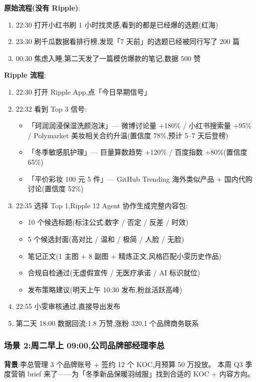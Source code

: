 \textbf{原始流程(没有 Ripple)}:
\begin{enumerate}
\item 22:30 打开小红书刷 1 小时找灵感,看到的都是已经爆的选题(红海)
\item 23:30 刷千瓜数据看排行榜,发现「7 天前」的选题已经被同行写了 200 篇
\item 00:30 焦虑入睡,第二天发了一篇模仿爆款的笔记,数据 500 赞
\end{enumerate}

\textbf{Ripple 流程}:
\begin{enumerate}
\item 22:30 打开 Ripple App,点「今日早期信号」
\item 22:32 看到 Top 3 信号:
    \begin{itemize}
    \item 「珂润润浸保湿洗颜泡沫」— 微博讨论量 +180\% / 小红书搜索量 +95\% /
        Polymarket 美妆相关合约升温(置信度 78\%,预计 5--7 天后登榜)
    \item 「冬季敏感肌护理」— 巨量算数趋势 +120\% / 百度指数 +80\%(置信度 65\%)
    \item 「平价彩妆 100 元 5 件」— GitHub Trending 海外类似产品 + 国内代购讨论(置信度 52\%)
    \end{itemize}
\item 22:35 选择 Top 1,Ripple 12 Agent 协作生成完整内容包:
    \begin{itemize}
    \item 10 个候选标题(标注公式:数字 / 否定 / 反差 / 时效)
    \item 5 个候选封面(高对比 / 温和 / 极简 / 人脸 / 无脸)
    \item 笔记正文(1 主图 + 8 副图 + 精炼正文,风格匹配小雯历史作品)
    \item 合规自检通过(无虚假宣传 / 无医疗承诺 / AI 标识就位)
    \item 发布策略建议(明天上午 10:30 发布,粉丝活跃高峰)
\end{itemize}
\item 22:55 小雯审核通过,直接导出发布
\item 第二天 18:00 数据回流:1.8 万赞,涨粉 320,1 个品牌商务联系
\end{enumerate}

\subsubsection{场景 2:周二早上 09:00,公司品牌部经理李总}

\textbf{背景}:李总管理 3 个品牌账号 + 签约 12 个 KOC,月预算 50 万投放。
本周 Q3 季度营销 brief 来了——为「冬季新品保暖羽绒服」找到合适的 KOC + 内容方向。

